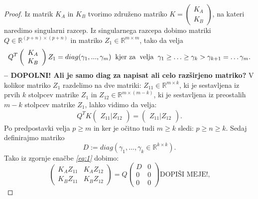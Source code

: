 \documentclass[mat1]{article}
\begin{document}
\begin{proof}

Iz matrik $K_A$ in $K_B$ tvorimo združeno matriko $K = \left(\begin{array}{c} K_A \\ K_B \end{array}\right)$, na kateri naredimo singularni razcep. Iz singularnega razcepa dobimo matriki $Q \in \mathbb{R}^{(p+n) \times (p+n)}$ in matriko $Z_1 \in \mathbb{R}^{m \times m}$, tako da velja 
\begin{equation}
Q^T \left(\begin{array}{c} K_A \\ K_B \end{array}\right) Z_1 = diag(\gamma_1,..., \gamma_m) \hspace{2mm} \text{kjer za} \hspace{1mm}  \hspace{1mm} \text{velja} \hspace{2mm}
\gamma_1 \geq \ldots \geq \gamma_k > \gamma_{k+1} = \ldots \gamma_m \text{.} \label{eq:1}
\end{equation}
\textbf{-- DOPOLNI! Ali je samo diag za napisat ali celo razširjeno matriko?}
V kolikor matriko $Z_1$ razdelimo na dve matriki: $Z_{11} \in \mathbb{R}^{m \times k}$, ki je sestavljena iz prvih $k$ stolpcev matrike $Z_1$ in $Z_{12} \in \mathbb{R}^{m \times (m-k)}$, ki je sestavljena iz preostalih $m-k$ stolpcev matrike $Z_1$, lahko vidimo da velja:
$$ Q^T K \left(\begin{array}{c} Z_{11} | Z_{12} \end{array}\right) =  \left(\begin{array}{c} Z_{11} | Z_{12} \end{array}\right) \text{.}
$$
Po predpostavki velja $p \geq m$ in ker je očitno tudi $m \geq k$ sledi: $p \geq n \geq k$. Sedaj definirajmo matriko 
$$ D := diag(\gamma_1,..., \gamma_k \in \mathbb{R}^{k \times k}) \text{.}
$$
Tako iz zgornje enačbe \textit{\eqref{eq:1}} dobimo:
\begin{equation}
\begin{pmatrix}
K_A Z_{11} & K_A Z_{12} \\ 
K_B Z_{11} & K_B Z_{12}
\end{pmatrix} = Q
\begin{pmatrix}
D & 0 \\ 
0 & 0 \\
0 & 0
\end{pmatrix} \text{DOPIŠI MEJE!,} \label{eq:2}

\end{equation}
\end{proof}
\end{document}
